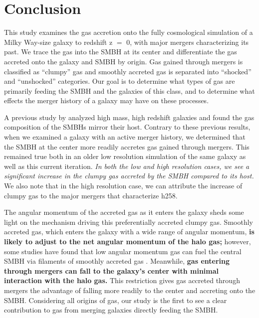\documentclass[]{emulateapj}
\begin{document}



\section{Conclusion}
This study examines the gas accretion onto the fully cosmological simulation of a Milky Way-size galaxy to redshift z $=$ 0, with major mergers characterizing its past. We trace the gas into the SMBH at its center and differentiate the gas accreted onto the galaxy and SMBH by origin. Gas gained through mergers is classified as ``clumpy'' gas and smoothly accreted gas is separated into ``shocked'' and ``unshocked'' categories. Our goal is to determine what types of gas are primarily feeding the SMBH and the galaxies of this class, and to determine what effects the merger history of a galaxy may have on these processes.

A previous study by \cite{Bellovary2013} analyzed high mass, high redshift galaxies and found the gas composition of the SMBHs mirror their host. Contrary to these previous results, when we examined a galaxy with an active merger history, we determined that the SMBH at the center more readily accretes gas gained through mergers. This remained true both in an older low resolution simulation of the same galaxy as well as this current iteration. \textit{In both the low and high resolution cases, we see a significant increase in the clumpy gas accreted by the SMBH compared to its host.} We also note that in the high resolution case, we can attribute the increase of clumpy gas to the major mergers that characterize h258. 

The angular momentum of the accreted gas as it enters the galaxy sheds some light on the mechanism driving this preferentially accreted clumpy gas. Smoothly accreted gas, which enters the galaxy with a wide range of angular momentum, \textbf{is likely to adjust to the net angular momentum of the halo gas;} however, some studies have found that low angular momentum gas can fuel the central SMBH via filaments of smoothly accreted gas \citep{Dubois2012,DiMatteo2016}. Meanwhile, \textbf{gas entering through mergers can fall to the galaxy's center with minimal interaction with the halo gas.} This restriction gives gas accreted through mergers the advantage of falling more readily to the center and accreting onto the SMBH. Considering all origins of gas, our study is the first to see a clear contribution to gas from merging galaxies directly feeding the SMBH.
\end{document}
